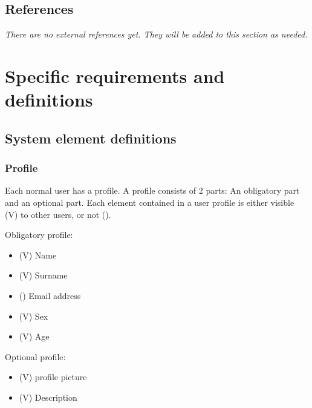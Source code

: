 \documentclass[a4wide]{article}
\begin{document}
\subsection{References}
\textit{There are no external references yet. They will be added to this section as needed.}
\section{Specific requirements and definitions}
\subsection{System element definitions}
\subsubsection{Profile}
Each normal user has a profile. 
A profile consists of 2 parts: An obligatory part and an optional part.
Each element contained in a user profile is either visible (V) to other users, or not ().

Obligatory profile:
\begin{itemize}
\item (V) Name
\item (V) Surname
\item () Email address
\item (V) Sex
\item (V) Age
\end{itemize}
Optional profile:
\begin{itemize}
\item (V) profile picture
\item (V) Description
\end{itemize}
\end{document}
